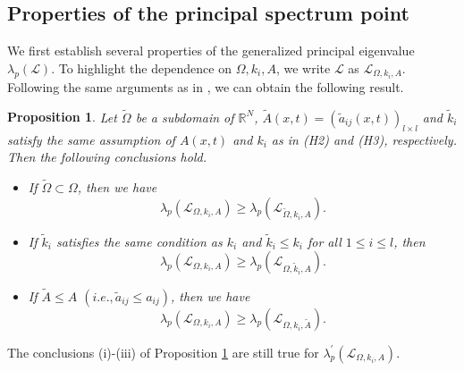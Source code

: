 \documentclass[11pt,reqno]{amsart}
\newtheorem{proposition}[theorem]{Proposition}
\numberwithin{equation}{section}
\begin{document}
\subsection{Properties of the principal spectrum point}
\indent

We first establish several properties of the generalized principal eigenvalue $\lambda_{p}(\mathcal{L})$. To highlight
the dependence on $\Omega, k_{i}, A$, we write $\mathcal{L}$ as $\mathcal{L}_{\Omega, k_{i}, A}$.
Following the same arguments as in \cite[Proposition 1.1]{Co10}, we can obtain the following result.

\begin{proposition}\label{PP2.11}
Let $\tilde\Omega$ be a subdomain of $\mathbb{R}^{N}$,  $\tilde{A}(x,t)= (\tilde{a}_{ij}(x,t))_{l\times l}$ and $\tilde{k}_{i}$ satisfy the same assumption of $A(x,t)$ and $k_{i}$ as in (H2) and (H3), respectively.
Then the following conclusions hold.
\begin{itemize}[leftmargin=0.9cm]

\item[(i)]
If $\tilde\Omega \subset \Omega$, then we have
\begin{equation*}
\lambda_{p}(\mathcal{L}_{\Omega, k_{i}, A}) \geq \lambda_{p}(\mathcal{L}_{\tilde\Omega, k_{i}, A}).
\end{equation*}


\item[(ii)]
If $\tilde{k}_{i}$ satisfies the same condition as $k_{i}$ and $ \tilde{k}_{i}\leq k_{i}$ for all $1\leq i \leq l$, then
\begin{equation*}
\lambda_{p}(\mathcal{L}_{\Omega, k_{i}, A})
\geq
\lambda_{p}(\mathcal{L}_{\Omega, \tilde{k}_{i}, A}).
\end{equation*}

\item[(iii)]
If $\tilde{A} \leq A $ $(i.e., \tilde{a}_{ij}\leq a_{ij})$, then we have
\begin{equation*}
\lambda_{p}(\mathcal{L}_{\Omega, k_{i}, A})
\geq
\lambda_{p}(\mathcal{L}_{\Omega, k_{i}, \tilde{A}}).
\end{equation*}

\end{itemize}
\end{proposition}
The conclusions (i)-(iii) of Proposition \ref{PP2.11} are still true for $\lambda_{p}^{\prime}(\mathcal{L}_{\Omega, {k}_{i}, A})$.
\end{document}
